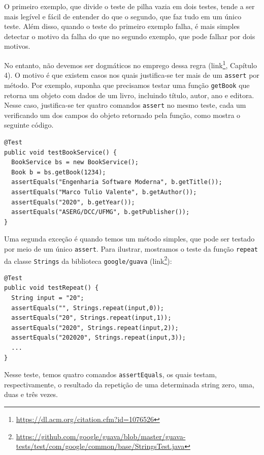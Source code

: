\documentclass[
  11pt,
  twoside]{book}
\newcommand{\passthrough}[1]{#1}
\DeclareRobustCommand{\href}[2]{#2\footnote{\url{#1}}}
\begin{document}
O primeiro exemplo, que divide o teste de pilha vazia em dois testes,
tende a ser mais legível e fácil de entender do que o segundo, que faz
tudo em um único teste. Além disso, quando o teste do primeiro exemplo
falha, é mais simples detectar o motivo da falha do que no segundo
exemplo, que pode falhar por dois motivos.

No entanto, não devemos ser dogmáticos no emprego dessa regra
(\href{https://dl.acm.org/citation.cfm?id=1076526}{link}, Capítulo 4). O
motivo é que existem casos nos quais justifica-se ter mais de um
\passthrough{\lstinline!assert!} por método. Por exemplo, suponha que
precisamos testar uma função \passthrough{\lstinline!getBook!} que
retorna um objeto com dados de um livro, incluindo título, autor, ano e
editora. Nesse caso, justifica-se ter quatro comandos
\passthrough{\lstinline!assert!} no mesmo teste, cada um verificando um
dos campos do objeto retornado pela função, como mostra o seguinte
código.

\newpage

\begin{lstlisting}
@Test
public void testBookService() {
  BookService bs = new BookService();
  Book b = bs.getBook(1234);
  assertEquals("Engenharia Software Moderna", b.getTitle());
  assertEquals("Marco Tulio Valente", b.getAuthor());
  assertEquals("2020", b.getYear());
  assertEquals("ASERG/DCC/UFMG", b.getPublisher());
}
\end{lstlisting}

Uma segunda exceção é quando temos um método simples, que pode ser
testado por meio de um único \passthrough{\lstinline!assert!}. Para
ilustrar, mostramos o teste da função \passthrough{\lstinline!repeat!}
da classe \passthrough{\lstinline!Strings!} da biblioteca
\passthrough{\lstinline!google/guava!}
(\href{https://github.com/google/guava/blob/master/guava-tests/test/com/google/common/base/StringsTest.java}{link}):

\begin{lstlisting}
@Test
public void testRepeat() {
  String input = "20";
  assertEquals("", Strings.repeat(input,0));
  assertEquals("20", Strings.repeat(input,1));
  assertEquals("2020", Strings.repeat(input,2));
  assertEquals("202020", Strings.repeat(input,3));
  ...
}
\end{lstlisting}

Nesse teste, temos quatro comandos
\passthrough{\lstinline!assertEquals!}, os quais testam,
respectivamente, o resultado da repetição de uma determinada string
zero, uma, duas e três vezes.
\end{document}
